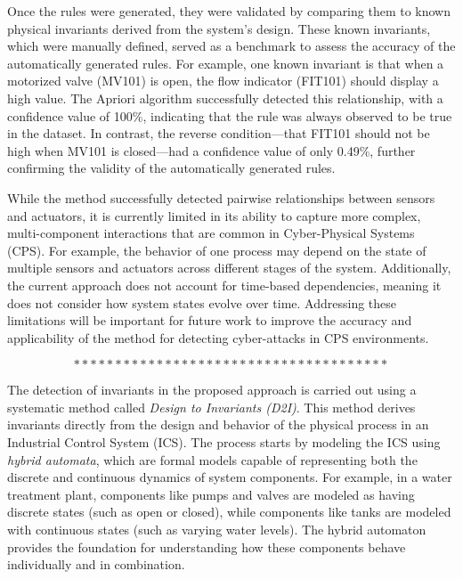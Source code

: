 Once the rules were generated, they were validated by comparing them to known physical invariants derived from the system's design. These known invariants, which were manually defined, served as a benchmark to assess the accuracy of the automatically generated rules. For example, one known invariant is that when a motorized valve (MV101) is open, the flow indicator (FIT101) should display a high value. The Apriori algorithm successfully detected this relationship, with a confidence value of 100\%, indicating that the rule was always observed to be true in the dataset. In contrast, the reverse condition—that FIT101 should not be high when MV101 is closed—had a confidence value of only 0.49\%, further confirming the validity of the automatically generated rules.

While the method successfully detected pairwise relationships between sensors and actuators, it is currently limited in its ability to capture more complex, multi-component interactions that are common in Cyber-Physical Systems (CPS). For example, the behavior of one process may depend on the state of multiple sensors and actuators across different stages of the system. Additionally, the current approach does not account for time-based dependencies, meaning it does not consider how system states evolve over time. Addressing these limitations will be important for future work to improve the accuracy and applicability of the method for detecting cyber-attacks in CPS environments\cite{25}.

$$**************************************$$

The detection of invariants in the proposed approach is carried out using a systematic method called \textit{Design to Invariants (D2I)}. This method derives invariants directly from the design and behavior of the physical process in an Industrial Control System (ICS). The process starts by modeling the ICS using \textit{hybrid automata}, which are formal models capable of representing both the discrete and continuous dynamics of system components. For example, in a water treatment plant, components like pumps and valves are modeled as having discrete states (such as open or closed), while components like tanks are modeled with continuous states (such as varying water levels). The hybrid automaton provides the foundation for understanding how these components behave individually and in combination.

